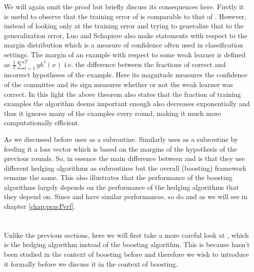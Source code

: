  We will again omit the proof but briefly discuss its consequences here. Firstly it is useful to observe that the training error of \NHB is comparable to that of \adaB. However, instead of looking only at the training error and trying to generalize that to the generalization error, Luo and Schapiere also make statements with respect to the margin distribution which is a measure of confidence often used in classification settings. The margin of an example with respect to some weak learner is defined as $\frac1T \sum^T_{t=1}yh^t(x)$ i.e. the difference between the fractions of correct and incorrect hypotheses of the example. Here its magnitude measures the confidence of the committee and its sign measures whether or not the weak learner was correct. In this light the above theorem also states that the fraction of training examples the algorithm deems important enough also decreases exponentially and thus it ignores many of the examples every round, making it much more computationally efficient.

 \par As we discussed before \adaB uses \hedge as a subroutine. Similarly \NHB uses \adaN as a subroutine by feeding it a loss vector which is based on the margins of the hypothesis of the previous rounds. So, in essence the main difference between \NHB and \adaB is that they use different hedging algorithms as subroutines but the overall (boosting) framework remains the same. This also illustrates that the performance of the boosting algorithms largely depends on the performance of the hedging algorithms that they depend on. Since \hedge and \adaN have similar performances, so do \adaB and \NHB as we will see in chapter \ref{chap:pracPerf}.


\section{\squintB}
\label{sec:squintB}
Unlike the previous sections, here we will first take a more careful look at \squint, which is the hedging algorithm instead of the boosting algorithm. This is because \squint hasn't been studied in the context of boosting before and therefore we wish to introduce it formally before we discuss it in the context of boosting. 

